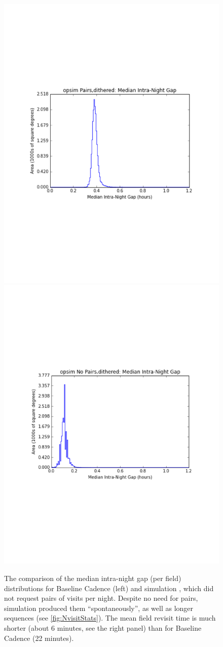 \begin{figure}[t!]
\vskip -1.2in
\includegraphics[angle=0,width=0.49\hsize:,clip]{figs/medintranight1.pdf}
\includegraphics[angle=0,width=0.49\hsize:,clip]{figs/medintranight2.pdf}
\vskip -1.3in
\caption{%
The comparison of the median intra-night gap (per field) distributions for Baseline Cadence (left)
and simulation , which did not request pairs of visits per night.
Despite no need for pairs, simulation  produced them ``spontaneously'',
as well as longer sequences (see \autoref{fig:NvisitStats}). The mean field revisit
time is much shorter (about 6 minutes, see the right panel) than for Baseline Cadence
(22 minutes).}
\label{fig:intranightgapCompare}
\end{figure}


